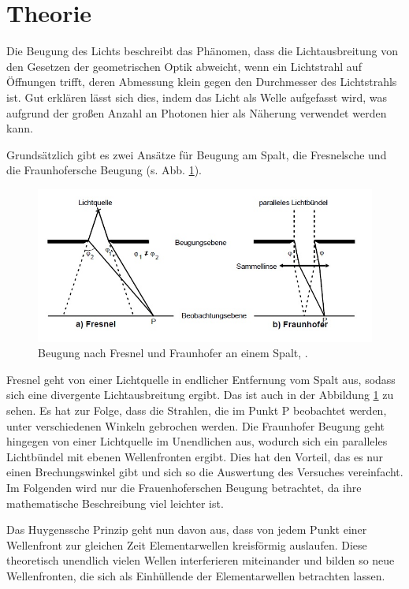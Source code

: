 \section{Theorie}
\label{sec:Theorie}
Die Beugung des Lichts beschreibt das Phänomen, dass die Lichtausbreitung von den Gesetzen der geometrischen Optik abweicht, wenn ein Lichtstrahl auf Öffnungen trifft, deren Abmessung klein gegen den Durchmesser des Lichtstrahls ist. Gut erklären lässt sich dies, indem das Licht als Welle aufgefasst wird, was aufgrund der großen Anzahl an Photonen hier als Näherung verwendet werden kann. 

Grundsätzlich gibt es zwei Ansätze für Beugung am Spalt, die Fresnelsche und die Fraunhofersche Beugung (s. Abb. \ref{fig:frauenhoferfresnel}). 

\begin{figure}[h!]
	\centering
	\includegraphics[width=0.9\linewidth]{FrauenhoferFresnel.jpg}
	\caption{Beugung nach Fresnel und Fraunhofer an einem Spalt, \cite[2]{anleitung406}.}
	\label{fig:frauenhoferfresnel}
\end{figure}

Fresnel geht von einer Lichtquelle in endlicher Entfernung vom Spalt aus, sodass sich eine divergente Lichtausbreitung ergibt. Das ist auch in der Abbildung \ref{fig:frauenhoferfresnel} zu sehen. Es hat zur Folge, dass die Strahlen, die im Punkt P beobachtet werden, unter verschiedenen Winkeln gebrochen werden. Die Fraunhofer Beugung geht hingegen von einer Lichtquelle im Unendlichen aus, wodurch sich ein paralleles Lichtbündel mit ebenen Wellenfronten ergibt. Dies hat den Vorteil, das es nur einen Brechungswinkel gibt und sich so die Auswertung des Versuches vereinfacht. Im Folgenden wird nur die Frauenhoferschen Beugung betrachtet, da ihre mathematische Beschreibung viel leichter ist. 

Das Huygenssche Prinzip geht nun davon aus, dass von jedem Punkt einer Wellenfront zur gleichen Zeit Elementarwellen kreisförmig auslaufen. Diese theoretisch unendlich vielen Wellen interferieren miteinander und bilden so neue Wellenfronten, die sich als Einhüllende der Elementarwellen betrachten lassen. 

